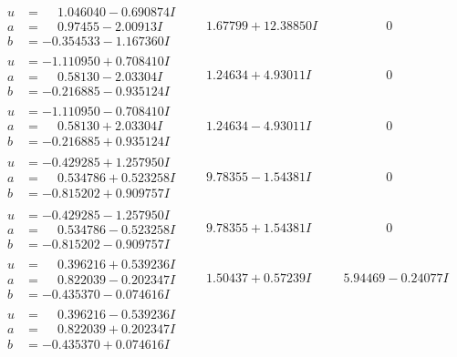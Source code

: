 \documentclass[1p]{elsarticle_modified}
\theoremstyle{definition}
\begin{document}
$$\begin{array}{c|c|c}
\begin{aligned}
u &= \phantom{-}1.046040 - 0.690874 I \\
a &= \phantom{-}0.97455 - 2.00913 I \\
b &= -0.354533 - 1.167360 I\end{aligned}
 & \phantom{-}1.67799 + 12.38850 I & \phantom{-0.000000 } 0 \\ \hline\begin{aligned}
u &= -1.110950 + 0.708410 I \\
a &= \phantom{-}0.58130 - 2.03304 I \\
b &= -0.216885 - 0.935124 I\end{aligned}
 & \phantom{-}1.24634 + 4.93011 I & \phantom{-0.000000 } 0 \\ \hline\begin{aligned}
u &= -1.110950 - 0.708410 I \\
a &= \phantom{-}0.58130 + 2.03304 I \\
b &= -0.216885 + 0.935124 I\end{aligned}
 & \phantom{-}1.24634 - 4.93011 I & \phantom{-0.000000 } 0 \\ \hline\begin{aligned}
u &= -0.429285 + 1.257950 I \\
a &= \phantom{-}0.534786 + 0.523258 I \\
b &= -0.815202 + 0.909757 I\end{aligned}
 & \phantom{-}9.78355 - 1.54381 I & \phantom{-0.000000 } 0 \\ \hline\begin{aligned}
u &= -0.429285 - 1.257950 I \\
a &= \phantom{-}0.534786 - 0.523258 I \\
b &= -0.815202 - 0.909757 I\end{aligned}
 & \phantom{-}9.78355 + 1.54381 I & \phantom{-0.000000 } 0 \\ \hline\begin{aligned}
u &= \phantom{-}0.396216 + 0.539236 I \\
a &= \phantom{-}0.822039 - 0.202347 I \\
b &= -0.435370 - 0.074616 I\end{aligned}
 & \phantom{-}1.50437 + 0.57239 I & \phantom{-}5.94469 - 0.24077 I \\ \hline\begin{aligned}
u &= \phantom{-}0.396216 - 0.539236 I \\
a &= \phantom{-}0.822039 + 0.202347 I \\
b &= -0.435370 + 0.074616 I\end{aligned}

\end{array}$$
\end{document}
